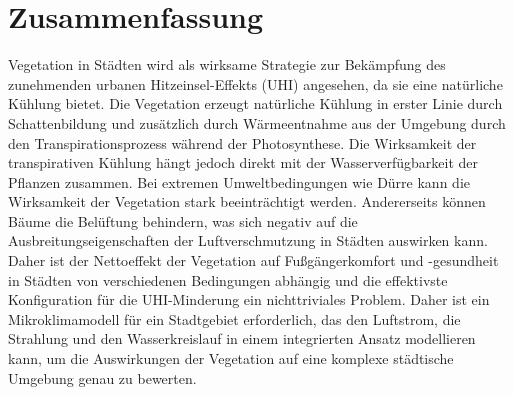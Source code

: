 \vskip 5cm

\vfill

\pagebreak

\chapter{Zusammenfassung}
\thispagestyle{empty}
Vegetation in St\"adten wird als wirksame Strategie zur Bek\"ampfung des zunehmenden urbanen Hitzeinsel-Effekts (UHI) angesehen, da sie eine nat\"urliche K\"uhlung bietet. Die Vegetation erzeugt natürliche Kühlung in erster Linie durch Schattenbildung und zusätzlich durch Wärmeentnahme aus der Umgebung durch den Transpirationsprozess während der Photosynthese. Die Wirksamkeit der transpirativen Kühlung hängt jedoch direkt mit der Wasserverfügbarkeit der Pflanzen zusammen. Bei extremen Umweltbedingungen wie Dürre kann die Wirksamkeit der Vegetation stark beeinträchtigt werden. Andererseits können Bäume die Belüftung behindern, was sich negativ auf die Ausbreitungseigenschaften der Luftverschmutzung in Städten auswirken kann. Daher ist der Nettoeffekt der Vegetation auf Fußgängerkomfort und -gesundheit in Städten von verschiedenen Bedingungen abhängig und die effektivste Konfiguration für die UHI-Minderung ein nichttriviales Problem. Daher ist ein Mikroklimamodell für ein Stadtgebiet erforderlich, das den Luftstrom, die Strahlung und den Wasserkreislauf in einem integrierten Ansatz modellieren kann, um die Auswirkungen der Vegetation auf eine komplexe städtische Umgebung genau zu bewerten.


